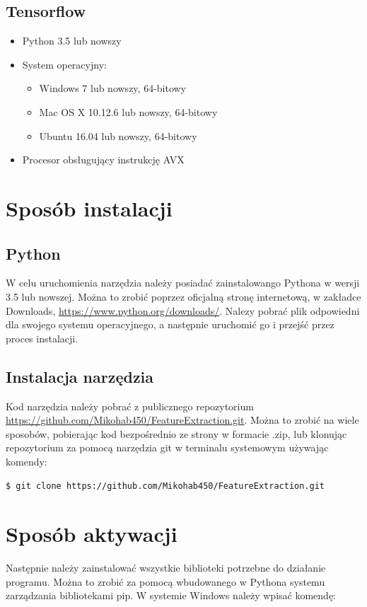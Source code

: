 \documentclass[a4paper,twoside,12pt]{book}
\begin{document}
{\subsection{Tensorflow}
\begin{itemize}
\item{Python 3.5 lub nowszy}
\item {System operacyjny:}
\begin{itemize}
\item {Windows 7 lub nowszy, 64-bitowy}
\item {Mac OS X 10.12.6 lub nowszy, 64-bitowy}
\item {Ubuntu 16.04 lub nowszy, 64-bitowy}
\end{itemize}
\item{Procesor obsługujący instrukcję AVX}

\end{itemize}
 
\section {Sposób instalacji}
\subsection{Python}
{W celu uruchomienia narzędzia należy posiadać zainstalowango Pythona w wersji 3.5 lub nowszej. Można to zrobić poprzez oficjalną stronę internetową, w zakładce Downloads, \url{https://www.python.org/downloads/}. Nalezy pobrać plik odpowiedni dla swojego systemu operacyjnego, a następnie uruchomić go i przejść przez proces instalacji.}
\subsection{Instalacja narzędzia}
{Kod narzędzia należy pobrać z publicznego repozytorium \url{https://github.com/Mikohab450/FeatureExtraction.git}. Można to zrobić na wiele sposobów, pobierając kod bezpośrednio ze strony w formacie .zip, lub klonując repozytorium za pomocą narzędzia git w terminalu  systemowym używając komendy: }

{\lstinline|$ git clone https://github.com/Mikohab450/FeatureExtraction.git| }

\section{Sposób aktywacji}
{Następnie należy zainstalować wszystkie biblioteki potrzebne do działanie programu. Można to zrobić za pomocą wbudowanego w Pythona systemu zarządzania bibliotekami pip. W systemie Windows należy wpisać komendę:}


}
\end{document}
